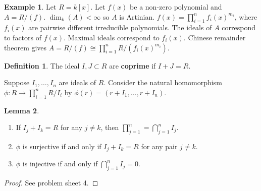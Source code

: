 \documentclass{article}
\newcommand{\rb}[1]{\left( #1 \right)}
\renewcommand{\sb}[1]{\left[ #1 \right]}
\theoremstyle{definition}\newtheorem{definition}{Definition}[section]
\theoremstyle{definition}\newtheorem{remark}[definition]{Remark}
\theoremstyle{definition}\newtheorem*{example}{Example}
\theoremstyle{definition}\newtheorem*{note}{Note}
\newtheorem{lemma}[definition]{Lemma}
\begin{document}
\begin{example}
Let $ R = k\sb{x} $. Let $ f\rb{x} $ be a non-zero polynomial and $ A = R / \rb{f} $. $ \dim_k\rb{A} < \infty $ so $ A $ is Artinian. $ f\rb{x} = \prod_{i = 1}^n f_i\rb{x}^{m_i} $, where $ f_i\rb{x} $ are pairwise different irreducible polynomials. The ideals of $ A $ correspond to factors of $ f\rb{x} $. Maximal ideals correspond to $ f_i\rb{x} $. Chinese remainder theorem gives $ A = R / \rb{f} \cong \prod_{i = 1}^n R / \rb{f_i\rb{x}^{m_i}} $.
\end{example}

\begin{definition}
The ideal $ I, J \subset R $ are \textbf{coprime} if $ I + J = R $.
\end{definition}

Suppose $ I_1, \dots, I_n $ are ideals of $ R $. Consider the natural homomorphism $ \phi : R \to \prod_{i = 1}^n R / I_i $ by $ \phi\rb{r} = \rb{r + I_1, \dots, r + I_n} $.

\begin{lemma}
\label{lem:12.17}
\hfill
\begin{enumerate}
\item If $ I_j + I_k = R $ for any $ j \ne k $, then $ \prod_{j = 1}^n = \bigcap_{j = 1}^n I_j $.
\item $ \phi $ is surjective if and only if $ I_j + I_k = R $ for any pair $ j \ne k $.
\item $ \phi $ is injective if and only if $ \bigcap_{j = 1}^n I_j = 0 $.
\end{enumerate}
\end{lemma}

\begin{proof}
See problem sheet 4.
\end{proof}
\end{document}
